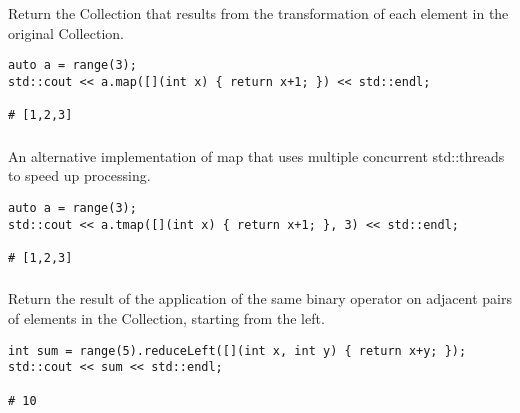 \subsubsection{}

Return the Collection that results from the transformation of each element in the original Collection.

\begin{lstlisting}[title=example]
auto a = range(3);
std::cout << a.map([](int x) { return x+1; }) << std::endl;

# [1,2,3]
\end{lstlisting}




\subsubsection{}

An alternative implementation of map that uses multiple concurrent
std::threads to speed up processing.

\begin{lstlisting}[title=example]
auto a = range(3);
std::cout << a.tmap([](int x) { return x+1; }, 3) << std::endl;

# [1,2,3]
\end{lstlisting}





\subsubsection{}

Return the result of the application of the same binary operator on adjacent pairs of elements in the Collection, starting from the left.

\begin{lstlisting}[title=example]
int sum = range(5).reduceLeft([](int x, int y) { return x+y; });
std::cout << sum << std::endl;

# 10
\end{lstlisting}




\subsubsection{}


